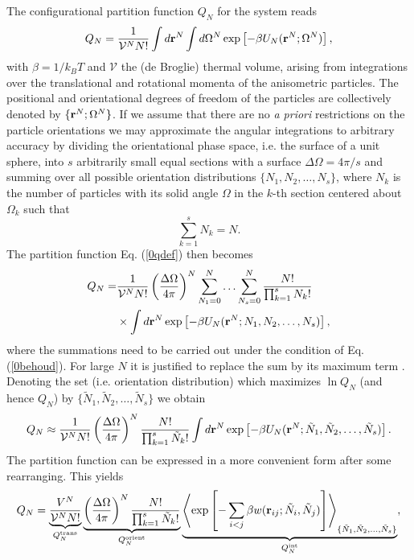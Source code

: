 \documentclass[amssymb]{revtex4}
\newcommand{\bfr}{{\bf r}}
\begin{document}
The configurational partition function $Q_{N}$ for the system reads
\begin{equation}
Q_{N}=\frac{1}{\mathcal{V} ^{N} N!}\int d\bfr^{N}\int d\Omega ^{N}\exp\left[-\beta U_{N}(\bfr^{N}; \Omega^{N})\right], 
\label{0qdef}
\end{equation}
with $\beta= 1/k_{B}T$ and $\mathcal{V}$ the (de Broglie) thermal volume, arising from 
integrations over the translational and rotational momenta of the anisometric particles.
The positional and orientational degrees of freedom of the particles are collectively denoted by 
$\{\bfr^{N};\Omega^{N}\}$.
If we assume that there are no  {\em a priori} restrictions on the particle orientations
we may approximate the  angular integrations  to arbitrary accuracy by dividing
the orientational phase space, i.e. the surface of a unit sphere, into $s$
arbitrarily small equal sections  with a surface $\Delta \Omega = 4\pi/s$ and summing over all
possible orientation distributions $\{N_{1},N_{2}, \ldots, N_{s}\}$, where $N_{k}$ is the 
number of particles with its solid angle $\Omega$ in the $k$-th section centered about
$\Omega_{k}$ such that 
\begin{equation}
\sum _{k=1}^{s} N_{k} =N. \label{0behoud}
\end{equation}
The partition function Eq. (\ref{0qdef}) then becomes
\begin{align}
Q_{N}=&\frac{1}{\mathcal{V} ^{N} N!}\left(\frac{\Delta \Omega}{4\pi}\right)^{N}
\sum_{N_{1}=0}^{N}\ldots \sum_{N_{s}=0}^{N}\frac{N!}{\prod_{k=1}^{s}N_{k}!} \nonumber \\
&\times\int d\bfr^{N}
\exp\left[-\beta U_{N}(\bfr^{N}; N_{1},N_{2},\ldots,N_{s})\right], \label{0Qalgemeen}
\end{align}
where the summations need to be carried out under the condition of Eq. (\ref{0behoud}).
For large $N$ it is justified to replace the sum  by its maximum term \cite{Hill}.
Denoting the set (i.e. orientation distribution) which maximizes $\ln Q_{N}$ (and hence $Q_{N}$) by 
 $\{\tilde{N}_{1},\tilde{N}_{2},\ldots,\tilde{N}_{s}\}$ we obtain 
\begin{equation}
Q_{N}\approx \frac{1}{\mathcal{V} ^{N} N!}\left(\frac{\Delta \Omega}{4\pi}\right)^{N}
\frac{N!}{\prod_{k=1}^{s}\tilde{N}_{k}!}\int d\bfr^{N}
\exp\left[-\beta U_{N}(\bfr^{N}; \tilde{N}_{1},\tilde{N}_{2},\ldots,\tilde{N}_{s})\right].
\end{equation}
The partition function can be expressed in a more convenient form after some rearranging. This yields
\begin{equation}
Q_{N}= \underbrace{\frac{V^{N}}{\mathcal{V} ^{N} N!}}_{Q_{N}^{\text{trans}}}
\underbrace{\left(\frac{\Delta \Omega}{4\pi}\right)^{N}
\frac{N!}{\prod_{k=1}^{s}\tilde{N}_{k}!}}_{Q_{N}^{\text{orient}}}
\underbrace{\left < \exp\left[-\sum_{i<j}\beta w(\bfr_{ij}; 
\tilde{N}_{i},\tilde{N}_{j})\right] \right >_{\{\tilde{N}_{1},\tilde{N}_{2},\ldots,\tilde{N}_{s}\}}
}_{Q_{N}^{\text{int}}},
\end{equation}
\end{document}
